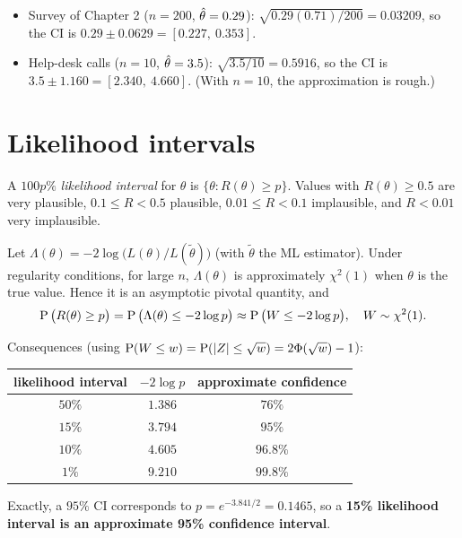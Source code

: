\begin{example}
\begin{itemize}
  \item Survey of Chapter 2 ($n=200$, $\hat{\theta}=0.29$):
        $\sqrt{0.29(0.71)/200} = 0.03209$, so the CI is $0.29\pm 0.0629 =
        [0.227,\ 0.353]$.
  \item Help-desk calls ($n=10$, $\hat{\theta}=3.5$): $\sqrt{3.5/10} = 0.5916$, so the CI is
        $3.5\pm1.160 = [2.340,\ 4.660]$. (With $n=10$, the approximation is rough.)
\end{itemize}
\end{example}

\section{Likelihood intervals}

\begin{definition}
A $100p\%$ \emph{likelihood interval} for $\theta$ is $\{\theta : R(\theta)\ge p\}$.
Values with $R(\theta)\ge 0.5$ are very plausible, $0.1\le R<0.5$ plausible,
$0.01\le R<0.1$ implausible, and $R<0.01$ very implausible.
\end{definition}

\begin{theorem}
Let $\Lambda(\theta) = -2\log\big(L(\theta)/L(\tilde\theta)\big)$ (with $\tilde\theta$ the
ML estimator). Under regularity conditions, for large $n$, $\Lambda(\theta)$ is
approximately $\chi^2(1)$ when $\theta$ is the true value. Hence it is an asymptotic
pivotal quantity, and
\[
\operatorname{P}\big(R(\theta)\ge p\big) = \operatorname{P}\big(\Lambda(\theta)\le -2\log p\big)
\approx \operatorname{P}\big(W \le -2\log p\big),\quad W\sim\chi^2(1).
\]
\end{theorem}

Consequences (using $\operatorname{P}(W\le w) = \operatorname{P}(|Z|\le\sqrt w) = 2\Phi(\sqrt w)-1$):
\begin{center}
\begin{tabular}{ccc}
\toprule
likelihood interval & $-2\log p$ & approximate confidence \\
\midrule
$50\%$ & $1.386$ & $76\%$ \\
$15\%$ & $3.794$ & $95\%$ \\
$10\%$ & $4.605$ & $96.8\%$ \\
$1\%$ & $9.210$ & $99.8\%$ \\
\bottomrule
\end{tabular}
\end{center}
Exactly, a $95\%$ CI corresponds to $p = e^{-3.841/2} = 0.1465$, so a \textbf{15\% likelihood
interval is an approximate 95\% confidence interval}.


